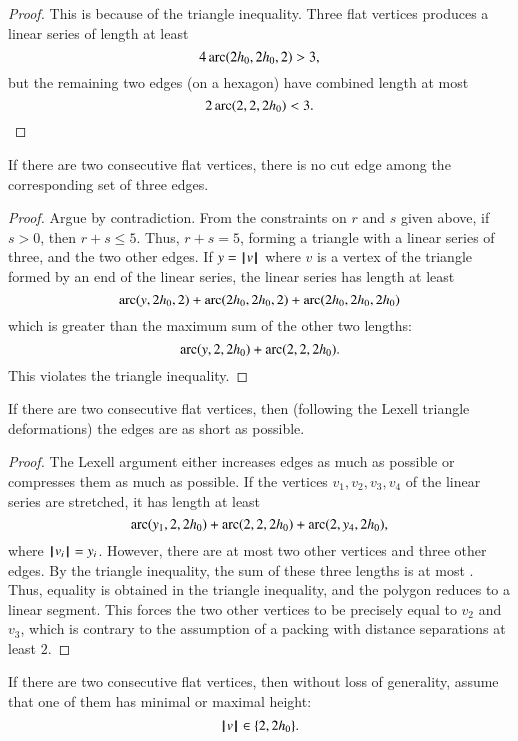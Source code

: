 \begin{proof} This is because of the triangle inequality.  Three flat vertices produces a linear series of length at least
$$
4\operatorname{arc}(2{h_0},2{h_0},2) > 3,
$$
but the remaining two edges (on a hexagon) have combined length at most
$$
2\operatorname{arc}(2,2,2{h_0}) < 3.
$$
\end{proof}

\begin{lemma}
If there are two consecutive flat vertices, there is no cut edge among the corresponding set of three edges.
\end{lemma}

\begin{proof}  Argue by contradiction.  From the constraints on $r$ and $s$ given above, if $s>0$, then $r+s\le 5$.  Thus, $r+s=5$, forming a triangle with a linear series of three, and the two other edges.  If $y={{\hskip0.1em|\hskip-0.15em|\hskip0.1em}v{\hskip0.1em|\hskip-0.15em|\hskip0.1em}}$ where $v$ is a vertex of the triangle formed by an end of the linear series, the linear series has length at least
$$
\operatorname{arc}(y,2{h_0},2)+\operatorname{arc}(2{h_0},2{h_0},2) +\operatorname{arc}(2{h_0},2{h_0},2{h_0})
$$
which is greater than the maximum sum of the other two lengths:
$$
\operatorname{arc}(y,2,2{h_0})+\operatorname{arc}(2,2,2{h_0}).
$$
This violates the triangle inequality.
\end{proof}

\begin{lemma}  If there are two consecutive flat vertices, then (following the Lexell triangle deformations) the edges are as short as possible.
\end{lemma}

\begin{proof} The Lexell argument either increases edges as much as possible or compresses them as much as possible.  If the vertices $v_1,v_2,v_3,v_4$ of the linear series are stretched, it has length at least
\begin{equation}\label{eqn:3side}
\operatorname{arc}(y_1,2,2{h_0})+\operatorname{arc}(2,2,2{h_0})+\operatorname{arc}(2,y_4,2{h_0}),
\end{equation}
where ${{\hskip0.1em|\hskip-0.15em|\hskip0.1em}v_i{\hskip0.1em|\hskip-0.15em|\hskip0.1em}}=y_i$.
However, there are at most two other vertices and three other edges.  By the triangle inequality, the sum of these three lengths is at most .
Thus, equality is obtained in the triangle inequality, and the polygon reduces to a linear segment.  This forces the two other vertices to be precisely equal to $v_2$ and $v_3$, which is contrary to the assumption of a packing with distance separations at least $2$.
\end{proof}

\begin{lemma} If there are two consecutive flat vertices, then without loss of generality,  assume that one of them has minimal or maximal height:
$${{\hskip0.1em|\hskip-0.15em|\hskip0.1em}v{\hskip0.1em|\hskip-0.15em|\hskip0.1em}}\in \{2,2{h_0}\}.$$
%
%
\end{lemma}

